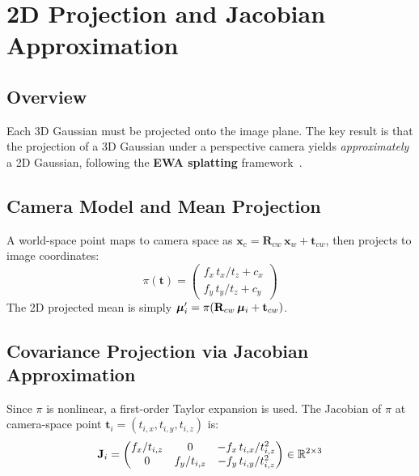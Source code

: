 \section{2D Projection and Jacobian Approximation}
\label{sec:projection}

\subsection{Overview}

Each 3D Gaussian must be projected onto the image plane. The key result is that
the projection of a 3D Gaussian under a perspective camera yields
\emph{approximately} a 2D Gaussian, following the \textbf{EWA splatting}
framework~\cite{zwicker2001ewa}.

\subsection{Camera Model and Mean Projection}

A world-space point maps to camera space as
$\mathbf{x}_c = \mathbf{R}_{cw}\,\mathbf{x}_w + \mathbf{t}_{cw}$,
then projects to image coordinates:
\begin{equation}
  \pi(\mathbf{t}) =
  \begin{pmatrix} f_x\,t_x/t_z + c_x \\ f_y\,t_y/t_z + c_y \end{pmatrix}
\end{equation}
The 2D projected mean is simply $\boldsymbol{\mu}'_i = \pi(\mathbf{R}_{cw}\,\boldsymbol{\mu}_i +
\mathbf{t}_{cw})$.

\subsection{Covariance Projection via Jacobian Approximation}

Since $\pi$ is nonlinear, a first-order Taylor expansion is used. The Jacobian
of $\pi$ at camera-space point $\mathbf{t}_i = (t_{i,x}, t_{i,y}, t_{i,z})$ is:
\begin{equation}
  \mathbf{J}_i =
  \begin{pmatrix}
    f_x/t_{i,z} & 0 & -f_x\,t_{i,x}/t_{i,z}^2 \\
    0 & f_y/t_{i,z} & -f_y\,t_{i,y}/t_{i,z}^2
  \end{pmatrix}
  \in \mathbb{R}^{2\times 3}
\end{equation}

